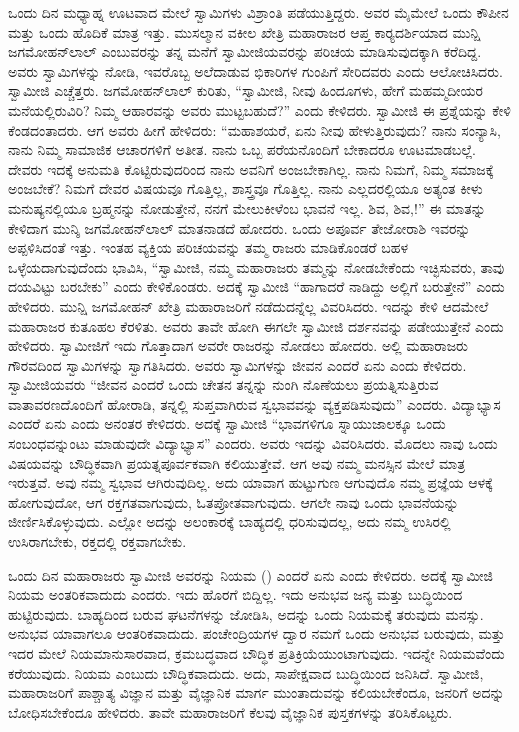  ಒಂದು ದಿನ ಮಧ್ಯಾಹ್ನ ಊಟವಾದ ಮೇಲೆ ಸ್ವಾಮಿಗಳು ವಿಶ್ರಾಂತಿ ಪಡೆಯುತ್ತಿದ್ದರು. ಅವರ ಮೈಮೇಲೆ ಒಂದು ಕೌಪೀನ ಮತ್ತು ಒಂದು ಹೊದಿಕೆ ಮಾತ್ರ ಇತ್ತು. ಮುಸಲ್ಮಾನ ವಕೀಲ ಖೇತ್ರಿ ಮಹಾರಾಜರ ಆಪ್ತ ಕಾರ‍್ಯದರ್ಶಿಯಾದ ಮುನ್ಷಿ ಜಗಮೋಹನ್‍ಲಾಲ್ ಎಂಬುವರನ್ನು ತನ್ನ ಮನೆಗೆ ಸ್ವಾಮೀಜಿಯವರನ್ನು ಪರಿಚಯ ಮಾಡಿಸುವುದಕ್ಕಾಗಿ ಕರೆದಿದ್ದ. ಅವರು ಸ್ವಾಮಿಗಳನ್ನು ನೋಡಿ, ಇವರೊಬ್ಬ ಅಲೆದಾಡುವ ಭಿಕಾರಿಗಳ ಗುಂಪಿಗೆ ಸೇರಿದವರು ಎಂದು ಆಲೋಚಿಸಿದರು. ಸ್ವಾಮೀಜಿ ಎಚ್ಚೆತ್ತರು. ಜಗಮೋಹನ್‍ಲಾಲ್ ಕುರಿತು, “ಸ್ವಾಮೀಜಿ, ನೀವು ಹಿಂದೂಗಳು, ಹೇಗೆ ಮಹಮ್ಮದೀಯರ ಮನೆಯಲ್ಲಿರುವಿರಿ? ನಿಮ್ಮ ಆಹಾರವನ್ನು ಅವರು ಮುಟ್ಟಬಹುದೆ?” ಎಂದು ಕೇಳಿದರು. ಸ್ವಾಮೀಜಿ ಈ ಪ್ರಶ್ನೆಯನ್ನು ಕೇಳಿ ಕೆಂಡದಂತಾದರು. ಆಗ ಅವರು ಹೀಗೆ ಹೇಳಿದರು: “ಮಹಾಶಯರೆ, ಏನು ನೀವು ಹೇಳುತ್ತಿರುವುದು? ನಾನು ಸಂನ್ಯಾಸಿ, ನಾನು ನಿಮ್ಮ ಸಾಮಾಜಿಕ ಆಚಾರಗಳಿಗೆ ಅತೀತ. ನಾನು ಒಬ್ಬ ಪರೆಯನೊಂದಿಗೆ ಬೇಕಾದರೂ ಊಟಮಾಡಬಲ್ಲೆ. ದೇವರು ಇದಕ್ಕೆ ಅನುಮತಿ ಕೊಟ್ಟಿರುವುದರಿಂದ ನಾನು ಅವನಿಗೆ ಅಂಜಬೇಕಾಗಿಲ್ಲ. ನಾನು ನಿಮಗೆ, ನಿಮ್ಮ ಸಮಾಜಕ್ಕೆ ಅಂಜಬೇಕೆ? ನಿಮಗೆ ದೇವರ ವಿಷಯವೂ ಗೊತ್ತಿಲ್ಲ, ಶಾಸ್ತ್ರವೂ ಗೊತ್ತಿಲ್ಲ. ನಾನು ಎಲ್ಲದರಲ್ಲಿಯೂ ಅತ್ಯಂತ ಕೀಳು ಮನುಷ್ಯನಲ್ಲಿಯೂ ಬ್ರಹ್ಮನನ್ನು ನೋಡುತ್ತೇನೆ, ನನಗೆ ಮೇಲುಕೀಳೆಂಬ ಭಾವನೆ ಇಲ್ಲ. ಶಿವ, ಶಿವ,!” ಈ ಮಾತನ್ನು ಕೇಳಿದಾಗ ಮುನ್ಶಿ ಜಗಮೋಹನ್‍ಲಾಲ್ ಮಾತನಾಡದೆ ಹೋದರು. ಒಂದು ಅಪೂರ್ವ ತೇಜೋರಾಶಿ ಇವರನ್ನು ಅಪ್ಪಳಿಸಿದಂತೆ ಇತ್ತು. ಇಂತಹ ವ್ಯಕ್ತಿಯ ಪರಿಚಯವನ್ನು ತಮ್ಮ ರಾಜರು ಮಾಡಿಕೊಂಡರೆ ಬಹಳ ಒಳ್ಳೆಯದಾಗುವುದೆಂದು ಭಾವಿಸಿ, “ಸ್ವಾಮೀಜಿ, ನಮ್ಮ ಮಹಾರಾಜರು ತಮ್ಮನ್ನು ನೋಡಬೇಕೆಂದು ಇಚ್ಛಿಸುವರು, ತಾವು ದಯವಿಟ್ಟು ಬರಬೇಕು” ಎಂದು ಕೇಳಿಕೊಂಡರು. ಅದಕ್ಕೆ ಸ್ವಾಮೀಜಿ “ಹಾಗಾದರೆ ನಾಡಿದ್ದು ಅಲ್ಲಿಗೆ ಬರುತ್ತೇನೆ” ಎಂದು ಹೇಳಿದರು. ಮುನ್ಷಿ ಜಗಮೋಹನ್ ಖೇತ್ರಿ ಮಹಾರಾಜರಿಗೆ ನಡೆದುದನ್ನೆಲ್ಲ ವಿವರಿಸಿದರು. ಇದನ್ನು ಕೇಳಿ ಆದಮೇಲೆ ಮಹಾರಾಜರ ಕುತೂಹಲ ಕೆರಳಿತು. ಅವರು ತಾವೇ ಹೋಗಿ ಈಗಲೇ ಸ್ವಾಮೀಜಿ ದರ್ಶನವನ್ನು ಪಡೇಯುತ್ತೇನೆ ಎಂದು ಹೇಳಿದರು. ಸ್ವಾಮೀಜಿಗೆ ಇದು ಗೊತ್ತಾದಾಗ ಅವರೇ ರಾಜರನ್ನು ನೋಡಲು ಹೋದರು. ಅಲ್ಲಿ ಮಹಾರಾಜರು ಗೌರವದಿಂದ ಸ್ವಾಮಿಗಳನ್ನು ಸ್ವಾಗತಿಸಿದರು. ಅವರು ಸ್ವಾಮಿಗಳನ್ನು ಜೀವನ ಎಂದರೆ ಏನು ಎಂದು ಕೇಳಿದರು. ಸ್ವಾಮೀಜಿಯವರು “ಜೀವನ ಎಂದರೆ ಒಂದು ಚೇತನ ತನ್ನನ್ನು ನುಂಗಿ ನೊಣೆಯಲು ಪ್ರಯತ್ನಿಸುತ್ತಿರುವ ವಾತಾವರಣದೊಂದಿಗೆ ಹೋರಾಡಿ, ತನ್ನಲ್ಲಿ ಸುಪ್ತವಾಗಿರುವ ಸ್ವಭಾವವನ್ನು ವ್ಯಕ್ತಪಡಿಸುವುದು” ಎಂದರು. ವಿದ್ಯಾಭ್ಯಾಸ ಎಂದರೆ ಏನು ಎಂದು ಅನಂತರ ಕೇಳಿದರು. ಅದಕ್ಕೆ ಸ್ವಾಮೀಜಿ “ಭಾವಗಳಿಗೂ ಸ್ನಾಯುಜಾಲಕ್ಕೂ ಒಂದು ಸಂಬಂಧವನ್ನುಂಟು ಮಾಡುವುದೇ ವಿದ್ಯಾಭ್ಯಾಸ” ಎಂದರು. ಅವರು ಇದನ್ನು ವಿವರಿಸಿದರು. ಮೊದಲು ನಾವು ಒಂದು ವಿಷಯವನ್ನು ಬೌದ್ಧಿಕವಾಗಿ ಪ್ರಯತ್ನಪೂರ್ವಕವಾಗಿ ಕಲಿಯುತ್ತೇವೆ. ಆಗ ಅವು ನಮ್ಮ ಮನಸ್ಸಿನ ಮೇಲೆ ಮಾತ್ರ ಇರುತ್ತವೆ. ಅವು ನಮ್ಮ ಸ್ವಭಾವ ಆಗಿರುವುದಿಲ್ಲ. ಅದು ಯಾವಾಗ ಹುಟ್ಟುಗುಣ ಆಗುವುದೊ ನಮ್ಮ ಪ್ರಜ್ಞೆಯ ಆಳಕ್ಕೆ ಹೋಗುವುದೋ, ಆಗ ರಕ್ತಗತವಾಗುವುದು, ಓತಪ್ರೋತವಾಗುವುದು. ಆಗಲೇ ನಾವು ಒಂದು ಭಾವನೆಯನ್ನು ಜೀರ್ಣಿಸಿಕೊಳ್ಳುವುದು. ಎಲ್ಲೋ ಅದನ್ನು ಅಲಂಕಾರಕ್ಕೆ ಬಾಹ್ಯದಲ್ಲಿ ಧರಿಸುವುದಲ್ಲ, ಅದು ನಮ್ಮ ಉಸಿರಲ್ಲಿ ಉಸಿರಾಗಬೇಕು, ರಕ್ತದಲ್ಲಿ ರಕ್ತವಾಗಬೇಕು. 

 ಒಂದು ದಿನ ಮಹಾರಾಜರು ಸ್ವಾಮೀಜಿ ಅವರನ್ನು ನಿಯಮ () ಎಂದರೆ ಏನು ಎಂದು ಕೇಳಿದರು. ಅದಕ್ಕೆ ಸ್ವಾಮೀಜಿ ನಿಯಮ ಅಂತರಿಕವಾದುದು ಎಂದರು. ಇದು ಹೊರಗೆ ಬಿದ್ದಿಲ್ಲ. ಇದು ಅನುಭವ ಜನ್ಯ ಮತ್ತು ಬುದ್ಧಿಯಿಂದ ಹುಟ್ಟಿರುವುದು. ಬಾಹ್ಯದಿಂದ ಬರುವ ಘಟನೆಗಳನ್ನು ಜೋಡಿಸಿ, ಅದನ್ನು ಒಂದು ನಿಯಮಕ್ಕೆ ತರುವುದು ಮನಸ್ಸು. ಅನುಭವ ಯಾವಾಗಲೂ ಆಂತರಿಕವಾದುದು. ಪಂಚೇಂದ್ರಿಯಗಳ ದ್ವಾರ ನಮಗೆ ಒಂದು ಅನುಭವ ಬರುವುದು, ಮತ್ತು ಇದರ ಮೇಲೆ ನಿಯಮಾನುಸಾರವಾದ, ಕ್ರಮಬದ್ಧವಾದ ಬೌದ್ಧಿಕ ಪ್ರತಿಕ್ರಿಯೆಯುಂಟಾಗುವುದು. ಇದನ್ನೇ ನಿಯಮವೆಂದು ಕರೆಯುವುದು. ನಿಯಮ ಎಂಬುದು ಬೌದ್ಧಿಕವಾದುದು. ಅದು, ಸಾಪೇಕ್ಷವಾದ ಬುದ್ಧಿಯಿಂದ ಜನಿಸಿದೆ. ಸ್ವಾಮೀಜಿ, ಮಹಾರಾಜರಿಗೆ ಪಾಶ್ಚಾತ್ಯ ವಿಜ್ಞಾನ ಮತ್ತು ವೈಜ್ಞಾನಿಕ ಮಾರ್ಗ ಮುಂತಾದುವನ್ನು ಕಲಿಯಬೇಕೆಂದೂ, ಜನರಿಗೆ ಅದನ್ನು ಬೋಧಿಸಬೇಕೆಂದೂ ಹೇಳಿದರು. ತಾವೇ ಮಹಾರಾಜರಿಗೆ ಕೆಲವು ವೈಜ್ಞಾನಿಕ ಪುಸ್ತಕಗಳನ್ನು ತರಿಸಿಕೊಟ್ಟರು. 

